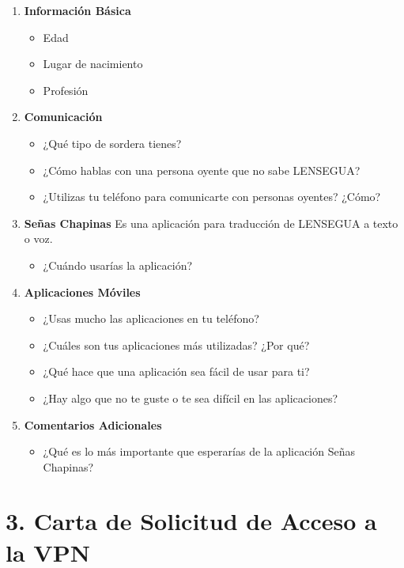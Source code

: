 \begin{enumerate}
    \item \textbf{Información Básica}
    \begin{itemize}
        \item Edad
        \item Lugar de nacimiento
        \item Profesión
    \end{itemize}

    \item \textbf{Comunicación}
    \begin{itemize}
        \item ¿Qué tipo de sordera tienes?
        \item ¿Cómo hablas con una persona oyente que no sabe LENSEGUA?
        \item ¿Utilizas tu teléfono para comunicarte con personas oyentes? ¿Cómo?
    \end{itemize}

    \item \textbf{Señas Chapinas}
    Es una aplicación para traducción de LENSEGUA a texto o voz.
    \begin{itemize}
        \item ¿Cuándo usarías la aplicación?
    \end{itemize}

    \item \textbf{Aplicaciones Móviles}
    \begin{itemize}
        \item ¿Usas mucho las aplicaciones en tu teléfono?
        \item ¿Cuáles son tus aplicaciones más utilizadas? ¿Por qué?
        \item ¿Qué hace que una aplicación sea fácil de usar para ti?
        \item ¿Hay algo que no te guste o te sea difícil en las aplicaciones?
    \end{itemize}

    \item \textbf{Comentarios Adicionales}
    \begin{itemize}
        \item ¿Qué es lo más importante que esperarías de la aplicación Señas Chapinas?
    \end{itemize}
\end{enumerate}






\section*{3. Carta de Solicitud de Acceso a la VPN}
